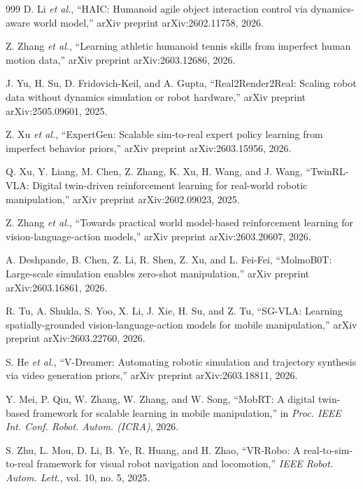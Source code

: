 ﻿\documentclass[11pt,a4paper]{article}
\begin{document}
\begin{thebibliography}{999}
D. Li \textit{et al.}, ``{HAIC}: Humanoid agile object interaction control via dynamics-aware world model,'' arXiv preprint arXiv:2602.11758, 2026.

Z. Zhang \textit{et al.}, ``Learning athletic humanoid tennis skills from imperfect human motion data,'' arXiv preprint arXiv:2603.12686, 2026.

J. Yu, H. Su, D. Fridovich-Keil, and A. Gupta, ``{Real2Render2Real}: Scaling robot data without dynamics simulation or robot hardware,'' arXiv preprint arXiv:2505.09601, 2025.

Z. Xu \textit{et al.}, ``{ExpertGen}: Scalable sim-to-real expert policy learning from imperfect behavior priors,'' arXiv preprint arXiv:2603.15956, 2026.

Q. Xu, Y. Liang, M. Chen, Z. Zhang, K. Xu, H. Wang, and J. Wang, ``{TwinRL-VLA}: Digital twin-driven reinforcement learning for real-world robotic manipulation,'' arXiv preprint arXiv:2602.09023, 2025.

Z. Zhang \textit{et al.}, ``Towards practical world model-based reinforcement learning for vision-language-action models,'' arXiv preprint arXiv:2603.20607, 2026.

A. Deshpande, B. Chen, Z. Li, R. Shen, Z. Xu, and L. Fei-Fei, ``{MolmoB0T}: Large-scale simulation enables zero-shot manipulation,'' arXiv preprint arXiv:2603.16861, 2026.

R. Tu, A. Shukla, S. Yoo, X. Li, J. Xie, H. Su, and Z. Tu, ``{SG-VLA}: Learning spatially-grounded vision-language-action models for mobile manipulation,'' arXiv preprint arXiv:2603.22760, 2026.

S. He \textit{et al.}, ``{V-Dreamer}: Automating robotic simulation and trajectory synthesis via video generation priors,'' arXiv preprint arXiv:2603.18811, 2026.

Y. Mei, P. Qiu, W. Zhang, W. Zhang, and W. Song, ``{MobRT}: A digital twin-based framework for scalable learning in mobile manipulation,'' in \textit{Proc. IEEE Int. Conf. Robot. Autom. (ICRA)}, 2026.

S. Zhu, L. Mou, D. Li, B. Ye, R. Huang, and H. Zhao, ``{VR-Robo}: A real-to-sim-to-real framework for visual robot navigation and locomotion,'' \textit{IEEE Robot. Autom. Lett.}, vol. 10, no. 5, 2025.


\end{thebibliography}
\end{document}
